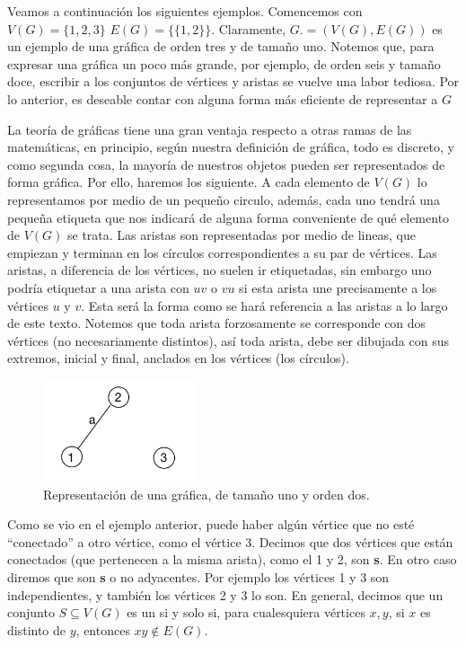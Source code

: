 Veamos a continuación los siguientes ejemplos.
Comencemos con $V(G)=\{1,2,3\}$  $E(G)=\{ \{1,2\} \}$. Claramente, $G. = (V(G), E(G))$ es un ejemplo de una gráfica de orden tres y de tamaño uno.   Notemos que, para expresar una gr\'afica un poco m\'as grande, por ejemplo, de orden seis y tama\~no doce, escribir a los conjuntos de v\'ertices y aristas se vuelve una labor tediosa. Por lo anterior, es deseable contar con alguna forma m\'as eficiente de representar a $G$

    
La teoría de gráficas tiene una gran ventaja respecto a otras ramas de las matemáticas, en principio, según nuestra definición de gráfica, todo es discreto, y como segunda cosa, la mayoría de nuestros objetos pueden ser representados de forma gráfica.
Por ello, haremos los siguiente.  A cada elemento de $V(G)$ lo representamos por medio de un pequeño circulo, adem\'as, cada uno tendrá una pequeña etiqueta que nos indicará de alguna forma conveniente de qué elemento de $V(G)$ se trata. Las aristas son representadas por medio de lineas, que empiezan y terminan en los círculos correspondientes a su par de vértices. Las aristas, a diferencia de los vértices, no suelen ir etiquetadas, sin embargo uno podría etiquetar a una arista con $uv$ o $vu$ si esta arista une precisamente a los vértices $u$ y $v$. Esta será la forma como se hará referencia a las aristas a lo largo de este texto.
Notemos que toda arista forzosamente se corresponde con dos vértices (no necesariamente distintos), así toda arista, debe ser dibujada con sus extremos, inicial y final, anclados en los vértices (los círculos).

\begin{figure}[H]
  \centering
  \includegraphics[width=0.4\textwidth]{recursos/capturas/01(1).jpg}
  \caption{Representación de una gráfica, de tamaño uno y orden dos.}
  \label{fig:01}
\end{figure}

Como se vio en el ejemplo anterior, puede haber algún vértice que no esté ``conectado'' a otro vértice, como el vértice 3.
Decimos que dos vértices que est\'an conectados (que pertenecen a la misma arista), como el 1 y 2, son \textbf{s}. 
En otro caso diremos que son \textbf{s} o no adyacentes. Por ejemplo los v\'ertices 1 y 3 son independientes, y tambi\'en los v\'ertices 2 y 3 lo son.
En general, decimos que un conjunto $S\subseteq V(G)$ es  un  si y solo si, para cualesquiera v\' ertices $x,y$, si $x$ es distinto de $y$, entonces $xy\notin E(G)$.

